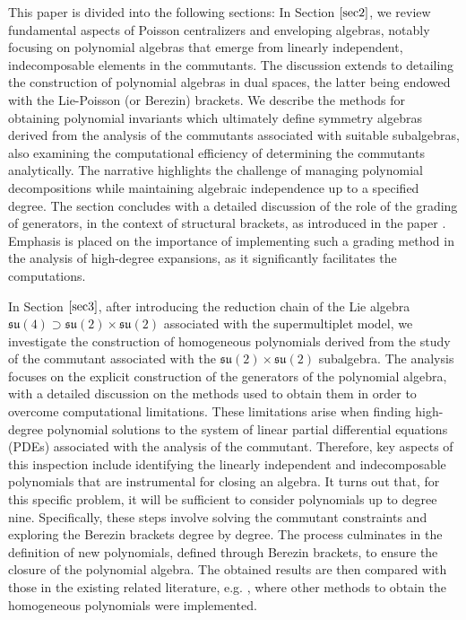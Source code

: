 \documentclass[10pt]{amsart}
\theoremstyle{definition}
\theoremstyle{corollary}
\theoremstyle{remark}
\theoremstyle{conclusion}
\begin{document}
This paper is divided into the following sections: In Section $\ref{sec2}$, we review fundamental aspects of Poisson centralizers and enveloping algebras, notably focusing on polynomial algebras that emerge from linearly independent, indecomposable elements in the commutants.  The discussion extends to detailing the construction of polynomial algebras in dual spaces, the latter being endowed with the Lie-Poisson (or Berezin) brackets. We describe the methods for obtaining polynomial invariants which ultimately define symmetry algebras derived from the analysis of the commutants associated with suitable subalgebras,  also examining the computational efficiency of determining the commutants analytically.  The narrative highlights the challenge of managing polynomial decompositions while maintaining algebraic independence up to a specified degree. The section concludes with a detailed discussion of the role of the grading of generators, in the context of structural brackets,  as introduced in the paper \cite{campoamor2025On}. Emphasis is placed on the importance of implementing such a grading method in the analysis of high-degree expansions, as it significantly facilitates the computations.

In Section $\ref{sec3}$, after introducing the reduction chain of the Lie algebra $\mathfrak{su}(4) \supset \mathfrak{su}(2) \times \mathfrak{su}(2)$ associated with the supermultiplet model, we investigate the construction of homogeneous polynomials derived from the study of the commutant associated with the $\mathfrak{su}(2) \times \mathfrak{su}(2)$ subalgebra. The analysis focuses on the explicit construction of the generators of the polynomial algebra, with a detailed discussion on the methods used to obtain them in order to overcome computational limitations. These limitations arise when finding high-degree polynomial solutions to the system of linear partial differential equations (PDEs) associated with the analysis of the commutant.  Therefore,  key aspects of this inspection include identifying the linearly independent and indecomposable polynomials that are instrumental for closing an algebra.  It turns out that, for this specific problem, it will be sufficient to consider polynomials up to degree nine. Specifically, these steps involve solving the commutant constraints and exploring the Berezin brackets degree by degree. The process culminates in the definition of new polynomials,  defined through Berezin brackets, to ensure the closure of the polynomial algebra. The obtained results are then compared with those in the existing related literature, e.g. \cite{nuclear}, where other methods to obtain the homogeneous polynomials were implemented.
\end{document}
